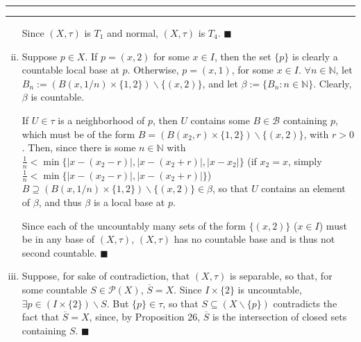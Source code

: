 \documentclass[11pt]{article}
\newcounter{questionCounter}
\newcounter{partCounter}[questionCounter]
\newenvironment{question}[2][\arabic{questionCounter}]{%
    \setcounter{partCounter}{0}%
    \vspace{.25in} \hrule \vspace{0.5em}%
        \noindent{\bf #2}%
    \vspace{0.8em} \hrule \vspace{.10in}%
    \addtocounter{questionCounter}{1}%
}{}
\renewcommand{\qed}{\quad $\blacksquare$}
\newcommand{\B}{\mathcal{B}}
\newcommand{\sminus}{\backslash}
\newcommand{\N}{\mathbb{N}} %
\newcommand{\pow}[1]{\mathcal{P}\left(#1\right)} %
\begin{document}
\begin{question}{Problem 4}
\begin{enumerate}[(i)]
Since $(X,\tau)$ is $T_1$ and normal, $(X,\tau)$ is $T_4$. \qed

\item Suppose $p \in X$. If $p = (x,2)$ for some $x \in I$, then the set
$\{p\}$ is clearly a countable local base at $p$. Otherwise, $p = (x,1)$, for
some $x \in I$. $\forall n \in \N$, let
$B_n := (B(x,1/n) \times \{1,2\}) \sminus \{(x,2)\}$, and let
$\beta := \{B_n : n \in \N\}$. Clearly, $\beta$ is countable.

If $U \in \tau$ is a neighborhood of $p$, then $U$ contains some
$B \in \B$ containing $p$, which must be of the form
$B = (B(x_2,r) \times \{1,2\}) \sminus \{(x,2)\}$, with $r > 0$. Then, since
there is some $n \in \N$ with
$\frac{1}{n} < \min\{|x - (x_2 - r)|,|x - (x_2 + r)|,|x - x_2|\}$ (if
$x_2 = x$, simply $\frac{1}{n} < \min\{|x - (x_2 - r)|,|x - (x_2 + r)|\}$)
$B \supseteq (B(x,1/n) \times \{1,2\}) \sminus \{(x,2)\} \in \beta$, so that
$U$ contains an element of $\beta$, and thus $\beta$ is a local base at $p$.

Since each of the uncountably many sets of the form $\{(x,2)\}$ ($x \in I$)
must be in any base of $(X,\tau)$, $(X,\tau)$ has no countable base and is
thus not second countable. \qed

\item Suppose, for sake of contradiction, that $(X,\tau)$ is separable, so
that, for some countable $S \in \pow{X}$, $\overline{S} = X$. Since
$I \times \{2\}$ is uncountable, $\exists p \in (I \times \{2\}) \sminus S$.
But $\{p\} \in \tau$, so that $S \subseteq (X \sminus \{p\})$ contradicts the
fact that $\overline{S} = X$, since, by Proposition 26, $\overline{S}$ is the
intersection of closed sets containing $S$. \qed

\end{enumerate}
\end{question}
\end{document}

